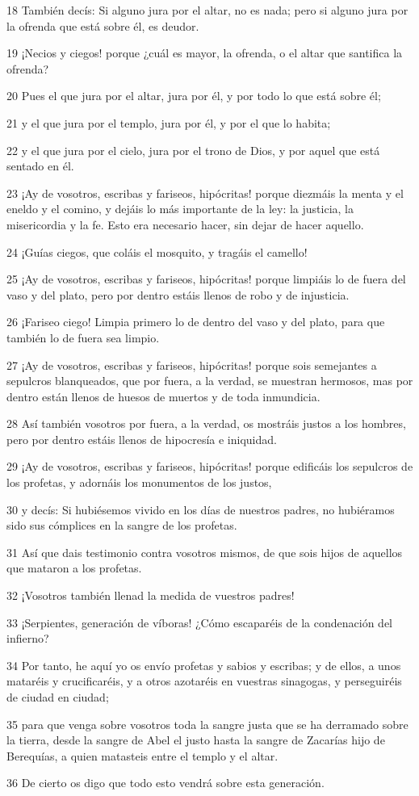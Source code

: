\par 18 También decís: Si alguno jura por el altar, no es nada; pero si alguno jura por la ofrenda que está sobre él, es deudor.
\par 19 ¡Necios y ciegos! porque ¿cuál es mayor, la ofrenda, o el altar que santifica la ofrenda?
\par 20 Pues el que jura por el altar, jura por él, y por todo lo que está sobre él;
\par 21 y el que jura por el templo, jura por él, y por el que lo habita;
\par 22 y el que jura por el cielo, jura por el trono de Dios, y por aquel que está sentado en él.
\par 23 ¡Ay de vosotros, escribas y fariseos, hipócritas! porque diezmáis la menta y el eneldo y el comino, y dejáis lo más importante de la ley: la justicia, la misericordia y la fe. Esto era necesario hacer, sin dejar de hacer aquello.
\par 24 ¡Guías ciegos, que coláis el mosquito, y tragáis el camello!
\par 25 ¡Ay de vosotros, escribas y fariseos, hipócritas! porque limpiáis lo de fuera del vaso y del plato, pero por dentro estáis llenos de robo y de injusticia.
\par 26 ¡Fariseo ciego! Limpia primero lo de dentro del vaso y del plato, para que también lo de fuera sea limpio.
\par 27 ¡Ay de vosotros, escribas y fariseos, hipócritas! porque sois semejantes a sepulcros blanqueados, que por fuera, a la verdad, se muestran hermosos, mas por dentro están llenos de huesos de muertos y de toda inmundicia.
\par 28 Así también vosotros por fuera, a la verdad, os mostráis justos a los hombres, pero por dentro estáis llenos de hipocresía e iniquidad.
\par 29 ¡Ay de vosotros, escribas y fariseos, hipócritas! porque edificáis los sepulcros de los profetas, y adornáis los monumentos de los justos,
\par 30 y decís: Si hubiésemos vivido en los días de nuestros padres, no hubiéramos sido sus cómplices en la sangre de los profetas.
\par 31 Así que dais testimonio contra vosotros mismos, de que sois hijos de aquellos que mataron a los profetas.
\par 32 ¡Vosotros también llenad la medida de vuestros padres!
\par 33 ¡Serpientes, generación de víboras! ¿Cómo escaparéis de la condenación del infierno?
\par 34 Por tanto, he aquí yo os envío profetas y sabios y escribas; y de ellos, a unos mataréis y crucificaréis, y a otros azotaréis en vuestras sinagogas, y perseguiréis de ciudad en ciudad;
\par 35 para que venga sobre vosotros toda la sangre justa que se ha derramado sobre la tierra, desde la sangre de Abel el justo hasta la sangre de Zacarías hijo de Berequías, a quien matasteis entre el templo y el altar.
\par 36 De cierto os digo que todo esto vendrá sobre esta generación.

